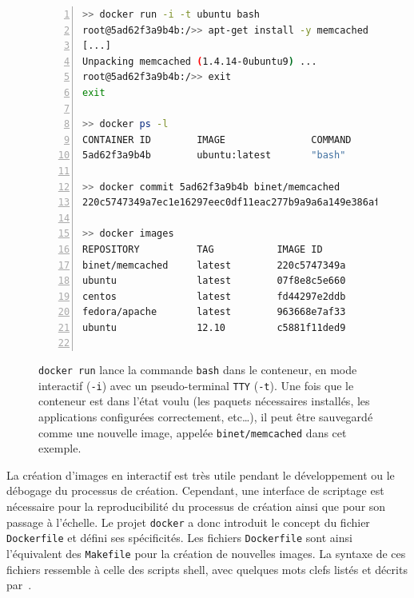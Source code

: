 \documentclass[a4paper]{article}
\begin{document}
\begin{figure}[h]
	\begin{lstlisting}[language=sh,
		basicstyle=\tiny,
		frame=trbl,
		numbers=left,
		showstringspaces=false,
	stringstyle=\ttfamily]
>> docker run -i -t ubuntu bash
root@5ad62f3a9b4b:/>> apt-get install -y memcached
[...]
Unpacking memcached (1.4.14-0ubuntu9) ...
root@5ad62f3a9b4b:/>> exit
exit

>> docker ps -l
CONTAINER ID        IMAGE               COMMAND             CREATED
5ad62f3a9b4b        ubuntu:latest       "bash"              3 minutes ago

>> docker commit 5ad62f3a9b4b binet/memcached
220c5747349a7ec1e16297eec0df11eac277b9a9a6a149e386aff9f63bec868e

>> docker images
REPOSITORY          TAG           IMAGE ID            CREATED             VIRTUAL SIZE
binet/memcached     latest        220c5747349a        4 minutes ago       190 MB
ubuntu              latest        07f8e8c5e660        5 days ago          188.3 MB
centos              latest        fd44297e2ddb        2 weeks ago         215.7 MB
fedora/apache       latest        963668e7af33        2 weeks ago         627.1 MB
ubuntu              12.10         c5881f11ded9        10 months ago       172.1 MB
 
\end{lstlisting}
\caption{\label{fig-docker-create}\texttt{docker run} lance la commande
	\texttt{bash} dans le conteneur, en mode interactif (\texttt{-i}) avec un
	pseudo-terminal \texttt{TTY} (\texttt{-t}).
	Une fois que le conteneur est dans l'\'etat voulu (les paquets n\'ecessaires
	install\'es, les applications configur\'ees correctement, etc\ldots), il
	peut \^etre sauvegard\'e comme une nouvelle image, appel\'ee
\texttt{binet/memcached} dans cet exemple.}
\end{figure}

La cr\'eation d'images en interactif est tr\`es utile pendant le d\'eveloppement
ou le d\'ebogage du processus de cr\'eation.
Cependant, une interface de scriptage est n\'ecessaire pour la reproducibilit\'e
du processus de cr\'eation ainsi que pour son passage \`a l'\'echelle.
Le projet \texttt{docker} a donc introduit le concept du fichier
\texttt{Dockerfile} et d\'efini ses sp\'ecificit\'es.
Les fichiers \texttt{Dockerfile} sont ainsi l'\'equivalent des \texttt{Makefile}
pour la cr\'eation de nouvelles images.
La syntaxe de ces fichiers ressemble \`a celle des scripts shell, avec quelques
mots clefs list\'es et d\'ecrits par~\cite{ref-docker-dockerfile}.
\end{document}
